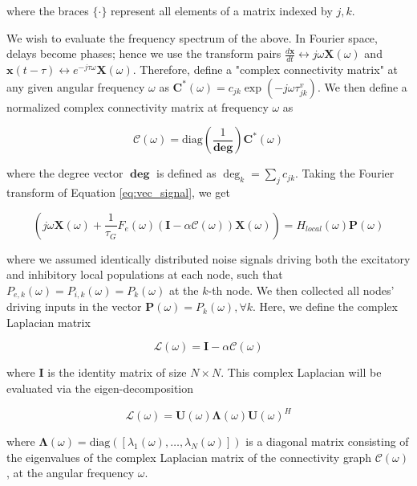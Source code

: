 where the braces $\{ \cdot \}$  represent all elements of a matrix
indexed by $j,k$.

We wish to evaluate the frequency spectrum of the above. In Fourier
space, delays become phases; hence we use the transform pairs
$\frac{d\mathbf{x}}{dt} \leftrightarrow j \omega \mathbf{X}(\omega)$ and
$\mathbf{x}(t - \tau) \leftrightarrow e^{- j\tau\omega}\mathbf{X}(\omega)$.
Therefore, define a "complex connectivity matrix" at any given angular
frequency $\omega$ as
$\mathbf{C}^{\mathbf{*}}(\omega) ={ c_{jk} \exp ( - j \omega \tau^{v}_{jk} ) }$.
We then define a normalized complex connectivity matrix at frequency
$\omega$ as

\begin{equation}
\label{eq:comp_conn}
\mathcal{C}(\omega) = \textrm{diag}(\frac{1}{\mathbf{\deg}}) \mathbf{C}^{\mathbf{*}}(\omega)
\end{equation}

where the degree vector $\mathbf{\deg}$ is defined as
$\deg_{k}= \sum_{j} c_{jk}$. Taking the Fourier transform
of Equation \ref{eq:vec_signal}, we get

\begin{equation}
\label{eq:fourier_sig}
(j \omega \mathbf{X}(\omega) + \frac{1}{\tau_{G}} F_{e}(\omega) (\mathbf{I} - \alpha \mathcal{C}(\omega)) \mathbf{X}(\omega)) = H_{local}(\omega) \mathbf{P}(\omega) 
\end{equation}

where we assumed identically distributed noise signals driving both the
excitatory and inhibitory local populations at each node, such that
$P_{e,k}(\omega) = P_{i,k}(\omega) = P_{k}(\omega)$ at the $k$-th node.
We then collected all nodes' driving inputs in the vector
$\mathbf{P}(\omega) = { P_{k}(\omega), \forall k }$.
Here, we define the complex Laplacian matrix

\begin{equation}
\label{eq:clap}
\mathcal{L}(\omega) = \mathbf{I} - \alpha \mathcal{C}(\omega)
\end{equation}

where $\mathbf{I}$ is the identity matrix of size $N \times N$. This
complex Laplacian will be evaluated via the eigen-decomposition

\begin{equation}
\label{eq:decomp}
\mathcal{L}(\omega) = \mathbf{U}(\omega)\mathbf{\Lambda}(\omega)\mathbf{U}(\omega)^{H}
\end{equation}

where
$\mathbf{\Lambda}(\omega) = \textrm{diag}([\lambda_{1}(\omega),\ldots,\lambda_{N}(\omega)])$
is a diagonal matrix consisting of the eigenvalues of the complex
Laplacian matrix of the connectivity graph $\mathcal{C}(\omega)$, at
the angular frequency $\omega$.


